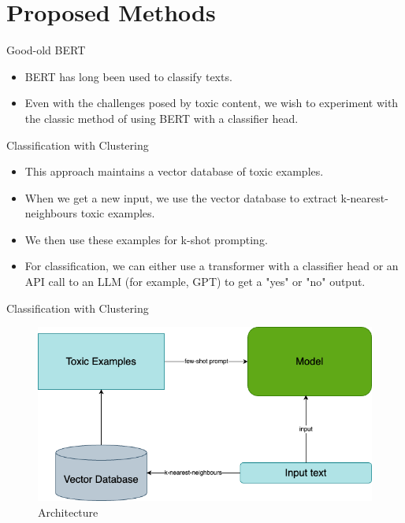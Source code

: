 \section{Proposed Methods}


\begin{frame}{Good-old BERT}

	\begin{itemize}
		\item BERT has long been used to classify texts.
		\item Even with the challenges posed by toxic content, we wish to experiment with the classic method of using BERT with a classifier head.
	\end{itemize}

\end{frame}


\begin{frame}{Classification with Clustering}

	\begin{itemize}
		\item This approach maintains a vector database of toxic examples.
		\item When we get a new input, we use the vector database to extract k-nearest-neighbours toxic examples.
		\item We then use these examples for k-shot prompting.
		\item For classification, we can either use a transformer with a classifier head or an API call to an LLM (for example, GPT) to get a "yes" or "no" output.
	\end{itemize}
    
\end{frame}


\begin{frame}{Classification with Clustering}

	\begin{figure}
		\centering
		\includegraphics[width=0.8\linewidth]{images/architecture.png}
		\caption{Architecture}
	\end{figure}

\end{frame}
